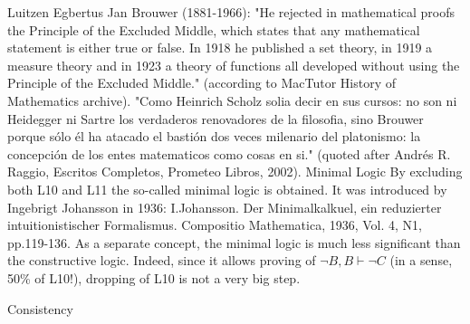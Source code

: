 Luitzen Egbertus Jan Brouwer (1881-1966): "He rejected in mathematical proofs the Principle of the Excluded Middle, which
states that any mathematical statement is either true or false. In 1918 he published a set theory, in 1919 a measure theory and in
1923 a theory of functions all developed without using the Principle of the Excluded Middle." (according to MacTutor History
of Mathematics archive). "Como Heinrich Scholz solia decir en sus cursos: no son ni Heidegger ni Sartre los verdaderos
renovadores de la filosofia, sino Brouwer porque sólo él ha atacado el bastión dos veces milenario del platonismo: la
concepción de los entes matematicos como cosas en si." (quoted after Andrés R. Raggio, Escritos Completos, Prometeo Libros,
2002).
Minimal Logic
By excluding both L10 and L11 the so-called minimal logic is obtained. It was introduced by Ingebrigt
Johansson in 1936:
I.Johansson. Der Minimalkalkuel, ein reduzierter intuitionistischer Formalismus. Compositio Mathematica, 1936, Vol. 4, N1,
pp.119-136.
As a separate concept, the minimal logic is much less significant than the constructive logic. Indeed, since
it allows proving of \(\neg B, B \vdash \neg C\) (in a sense, 50\% of L10!), dropping of L10 is not a very big step.

Consistency

